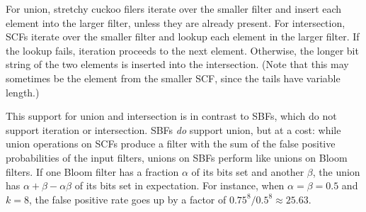 \documentclass[letterpaper,twocolumn,10pt]{article}
\newcommand{\taffy}{stretchy}
\newcommand{\TBF}{SBF}
\newcommand{\TCF}{SCF}
\newcommand{\taffy}{taffy}
\newcommand{\TBF}{TBF}
\newcommand{\TCF}{TCF}
\begin{document}



For union, \taffy{} cuckoo filers iterate over the smaller filter and insert each element into the larger filter, unless they are already present.
For intersection, \TCF{}s iterate over the smaller filter and lookup each element in the larger filter.
If the lookup fails, iteration proceeds to the next element.
Otherwise, the longer bit string of the two elements is inserted into the intersection.
(Note that this may sometimes be the element from the smaller \TCF{}, since the tails have variable length.)


This support for union and intersection is in contrast to \TBF{}s, which do not support iteration or intersection.
\TBF{}s {\em do} support union, but at a cost: while union operations on \TCF{}s produce a filter with the sum of the false positive probabilities of the input filters, unions on \TBF{}s perform like unions on Bloom filters.
If one Bloom filter has a fraction $\alpha$ of its bits set and another $\beta$, the union has $\alpha + \beta - \alpha \beta$ of its bits set in expectation.
For instance, when $\alpha = \beta = 0.5$ and $k = 8$, the false positive rate goes up by a factor of $0.75^8/0.5^8 \approx 25.63$. %
\end{document}
